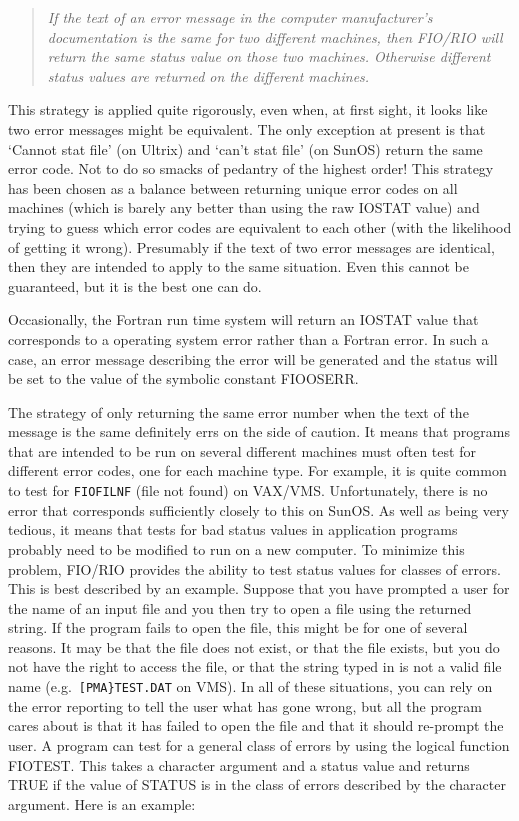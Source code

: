 \documentclass[twoside,11pt]{article}
\renewcommand{\_}{\texttt{\symbol{95}}}
\begin{document}
\begin{quote}{\it
If the text of an error message in the computer manufacturer's documentation is
the same for two different machines, then FIO/RIO will return the same status
value on those two machines. Otherwise different status values are returned on
the different machines.
}
\end{quote}

This strategy is applied quite rigorously, even when, at first sight, it looks
like two error messages might be equivalent. The only exception at present is
that `Cannot stat file' (on Ultrix) and `can't stat file' (on SunOS) return the
same error code. Not to do so smacks of pedantry of the highest order! This
strategy has been chosen as a balance between returning unique error codes on
all machines (which is barely any better than using the raw IOSTAT value) and
trying to guess which error codes are equivalent to each other (with the
likelihood of getting it wrong). Presumably if the text of two error messages
are identical, then they are intended to apply to the same situation. Even this
cannot be guaranteed, but it is the best one can do.

Occasionally, the Fortran run time system will return an IOSTAT value that
corresponds to a operating system error rather than a Fortran error. In such a
case, an error message describing the error will be generated and the status
will be set to the value of the symbolic constant FIO\_\_OSERR.

The strategy of only returning the same error number when the text of the
message is the same definitely errs on the side of caution. It means that
programs that are intended to be run on several different machines must often
test for different error codes, one for each machine type. For example, it is
quite common to test for {\tt FIO\_\_FILNF} (file not found) on VAX/VMS.
Unfortunately, there is no error that corresponds sufficiently closely to this
on SunOS. As well as being very tedious, it means that tests for bad status
values in application programs probably need to be modified to run on a new
computer. To minimize this problem, FIO/RIO provides the ability to test status
values for classes of errors. This is best described by an example. Suppose
that you have prompted a user for the name of an input file and you then try to
open a file using the returned string. If the program fails to open the file,
this might be for one of several reasons. It may be that the file
does not exist, or that the file exists, but you do not have the right to
access the file, or that the string typed in is not a valid file name 
(e.g.\ {\tt [PMA\}TEST.DAT} on VMS). 
In all of these situations, you can rely on the error reporting to tell the 
user what has gone wrong, but all the program cares about is that it has 
failed to open the file and that it should re-prompt the user. 
A program can test for a general class of errors by using the logical function
FIO\_TEST. This takes a character argument and a status value and returns TRUE
if the value of STATUS is in the class of errors described by the character
argument.
Here is an example:
\end{document}
